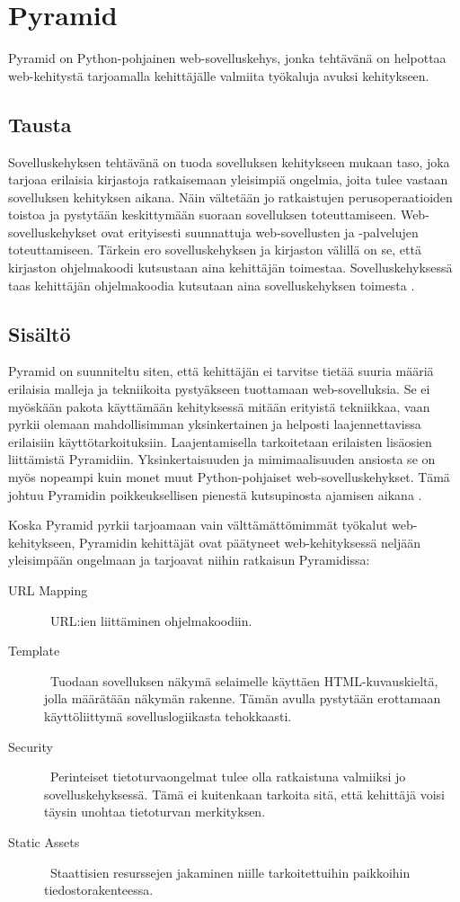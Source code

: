 \documentclass[finnish,utf8,nonumbib,palatino,kandi]{gradu2}
\begin{document}
\section{Pyramid}
Pyramid on Python-pohjainen web-sovelluskehys, jonka tehtävänä on helpottaa web-kehitystä tarjoamalla
kehittäjälle valmiita työkaluja avuksi kehitykseen.

\subsection{Tausta}
Sovelluskehyksen tehtävänä on tuoda sovelluksen kehitykseen mukaan
taso, joka tarjoaa erilaisia kirjastoja ratkaisemaan yleisimpiä ongelmia, joita tulee vastaan sovelluksen kehityksen aikana. Näin vältetään
jo ratkaistujen perusoperaatioiden toistoa ja pystytään keskittymään suoraan sovelluksen toteuttamiseen. Web-sovelluskehykset ovat erityisesti suunnattuja
web-sovellusten ja -palvelujen toteuttamiseen\cite{Frameworks}.  Tärkein ero sovelluskehyksen ja kirjaston välillä on se, että kirjaston ohjelmakoodi kutsustaan aina
kehittäjän toimestaa. Sovelluskehyksessä taas kehittäjän ohjelmakoodia kutsutaan aina sovelluskehyksen toimesta \cite{Pyramid:intr}.

\subsection{Sisältö}
Pyramid on suunniteltu siten, että kehittäjän ei tarvitse tietää suuria määriä erilaisia malleja ja tekniikoita pystyäkseen tuottamaan web-sovelluksia. Se ei myöskään pakota käyttämään kehityksessä
mitään erityistä tekniikkaa, vaan pyrkii olemaan mahdollisimman yksinkertainen ja helposti laajennettavissa erilaisiin käyttötarkoituksiin. Laajentamisella tarkoitetaan erilaisten lisäosien
liittämistä Pyramidiin. Yksinkertaisuuden ja mimimaalisuuden ansiosta se on myös nopeampi kuin monet muut Python-pohjaiset web-sovelluskehykset. Tämä johtuu Pyramidin poikkeuksellisen
pienestä kutsupinosta ajamisen aikana \cite{Pyramid:intr}. 

Koska Pyramid pyrkii tarjoamaan vain välttämättömimmät työkalut web-kehitykseen, Pyramidin kehittäjät
ovat päätyneet web-kehityksessä neljään yleisimpään ongelmaan ja tarjoavat niihin ratkaisun Pyramidissa:

\begin{description}
\item [URL Mapping] \ URL:ien liittäminen ohjelmakoodiin.
\item[Template] \ Tuodaan sovelluksen näkymä selaimelle käyttäen HTML-kuvauskieltä, jolla määrätään näkymän rakenne. Tämän avulla pystytään erottamaan käyttöliittymä sovelluslogiikasta tehokkaasti.
\item[Security] \ Perinteiset tietoturvaongelmat tulee olla ratkaistuna valmiiksi jo sovelluskehyksessä. Tämä ei kuitenkaan tarkoita sitä, että kehittäjä voisi täysin unohtaa tietoturvan merkityksen.
\item[Static Assets] \ Staattisien resurssejen jakaminen niille tarkoitettuihin paikkoihin tiedostorakenteessa.
\end{description}
\end{document}
